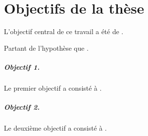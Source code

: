\chapter*{Objectifs de la thèse} %


L’objectif central de ce travail a été de \lipsum[70].

Partant de l’hypothèse que \lipsum[60].

\paragraph{Objectif 1.}
Le premier objectif a consisté à \lipsum[60].

\paragraph{Objectif 2.}
Le deuxième objectif a consisté à \lipsum[60].